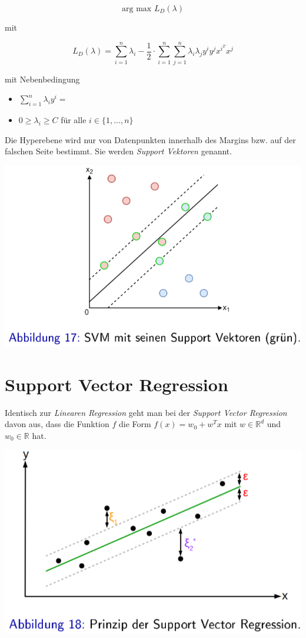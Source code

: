 \documentclass{report}
\begin{document}
$$\text{arg max }L_D(\lambda)$$

mit

$$L_D(\lambda) = \sum_{i=1}^n\lambda_i -\frac{1}{2}\cdot\sum_{i=1}^n\sum_{j=1}^n\lambda_i\lambda_jy^iy^jx^{i^T}x^j$$

mit Nebenbedingung\\
\vspace*{-1.5em}
\begin{itemize}
  \item $\sum_{i=1}^n\lambda_iy^i = $
  \item $0\geq \lambda_i\geq C$ für alle $i\in \{1, ..., n\}$
\end{itemize}

Die Hyperebene wird nur von Datenpunkten innerhalb des Margins bzw. auf der falschen Seite bestimmt.
Sie werden \textit{Support Vektoren} genannt.

\begin{center}
  \includegraphics[scale=.275]{ml06_17}
\end{center}

\section{Support Vector Regression}

Identisch zur \textit{Linearen Regression} geht man bei der \textit{Support Vector Regression} davon aus,
dass die Funktion $f$ die Form $f(x) = w_0 + w^Tx$ mit $w\in \mathbb{R}^d$ und $w_0\in \mathbb{R}$ hat.

\begin{center}
  \includegraphics[scale=.285]{ml06_18}
\end{center}
\end{document}
